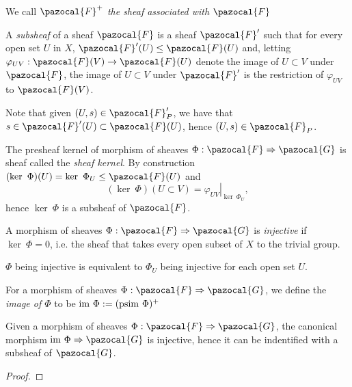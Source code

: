\begin{remark}
    We call $\pazocal{F}^{+}$ \emph{the sheaf associated with $\pazocal{F}$}
\end{remark}
\begin{definition}
    A \emph{subsheaf} of a sheaf $\pazocal{F}$ is a sheaf $\pazocal{F}'$ such that for every open set $U$ in $X$, $\pazocal{F}'(U)\leq \pazocal{F}(U)$ and, letting $\varphi_{UV}:\pazocal{F}(V)\rightarrow \pazocal{F}(U)$ denote the image of $U\subset V$ under $\pazocal{F}$, the image of $U\subset V$ under $\pazocal{F}'$ is the restriction of $\varphi_{UV}$ to $\pazocal{F}(V)$.
\end{definition}
\begin{remark}
    Note that given $(U,s)\in \pazocal{F}'_P$, we have that $s\in \pazocal{F}'(U)\subset \pazocal{F}(U)$, hence $(U,s)\in \pazocal{F}_P$. 
\end{remark}
\begin{example}
    The presheaf kernel of morphism of sheaves $\Phi:\pazocal{F}\Rightarrow \pazocal{G}$ is sheaf called the \emph{sheaf kernel}. By construction $(\ker \ \Phi)(U) = \ker \ \Phi_U \leq \pazocal{F}(U)$ and 
    $$(\ker \ \Phi)(U\subset V) = \left. \varphi_{UV}\right|_{\ker\ \Phi_U},$$
    hence $\ker \ \Phi$ is a subsheaf of $\pazocal{F}$. 
\end{example}
\begin{definition}
    A morphism of sheaves $\Phi:\pazocal{F}\Rightarrow \pazocal{G}$ is \emph{injective} if $\ker \ \Phi=0$, i.e. the sheaf that takes every open subset of $X$ to the trivial group.
\end{definition}
\begin{remark}
    $\Phi$ being injective is equivalent to $\Phi_U$ being injective for each open set $U$. 
\end{remark}
\begin{definition}
    For a morphism of sheaves $\Phi: \pazocal{F}\Rightarrow \pazocal{G}$, we define the \emph{image of $\Phi$} to be $\im \ \Phi:= (\mathrm{psim}\ \Phi)^{+}$
\end{definition}
\begin{proposition}
    Given a morphism of sheaves $\Phi:\pazocal{F}\Rightarrow \pazocal{G}$, the canonical morphism $\im\ \Phi\Rightarrow \pazocal{G}$ is injective, hence it can be indentified with a subsheaf of $\pazocal{G}$. 
\end{proposition}
\begin{proof}
    
\end{proof}
